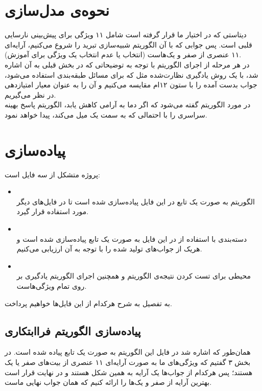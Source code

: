 \documentclass{article}
\begin{document}
\begin{multicols}{2}
\section{
نحوه‌ی مدل‌سازی
}
دیتاستی که در اختیار ما قرار گرفته است شامل ۱۱ ویژگی برای پیش‌بینی نارسایی قلبی است. پس جوابی که با آن الگوریتم شبیه‌سازی تبرید را شروع می‌کنیم، آرایه‌ای ۱۱ عنصری از صفر و یک‌هاست
(انتخاب یا عدم انتخاب یک ویژگی برای آموزش).\\
در هر مرحله از اجرای الگوریتم با توجه به توضیحاتی که در بخش قبلی به آن اشاره شد، با یک روش یادگیری نظارت‌شده مثل
که برای مسائل طبقه‌بندی استفاده می‌شود، جواب بدست آمده را با ستون ۱۲ام مقایسه می‌کنیم و آن را به عنوان معیار امتیازدهی در نظر می‌گیریم.\\
در مورد الگوریتم 
گفته می‌شود که اگر دما به آرامی کاهش یابد، الگوریتم پاسخ بهینه سراسری را با احتمالی که به سمت یک میل می‌کند، پیدا خواهد نمود.

\section{
پیاده‌سازی
}
پروژه متشکل از سه فایل است:
\begin{itemize}
    \item {}\\
    الگوریتم
    به صورت یک تابع در این فایل پیاده‌سازی شده است تا در فایل‌های دیگر مورد استفاده قرار گیرد.
    \item {}\\
    دسته‌بندی با استفاده از
    در این فایل به صورت یک تابع
    پیاده‌سازی شده است و هریک از جواب‌های تولید شده را با توجه به
    آن ارزیابی می‌کنیم.
    \item {}\\
    محیطی برای تست کردن نتیجه‌ی الگوریتم و همچنین اجرای الگوریتم یادگیری بر روی تمام ویژگی‌هاست.
\end{itemize}
به تفصیل به شرح هرکدام از این فایل‌ها خواهیم پرداخت.

\subsection{
پیاده‌سازی الگوریتم فراابتکاری
}
همان‌طور که اشاره شد در فایل
این الگوریتم به صورت یک تابع پیاده شده است. در بخش ۳ گفتیم که ویژگی‌های ما به صورت آرایه‌ای ۱۱ عنصری از بیت‌های صفر یا یک هستند؛ پس هرکدام از جواب‌ها یک آرایه به همین شکل هستند و در نهایت قرار است بهترین آرایه از صفر و یک‌ها را ارائه کنیم که همان جواب نهایی ماست.


\end{multicols}
\end{document}
